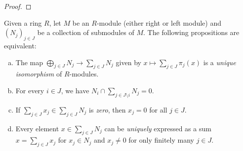 \begin{proof}


\end{proof}



\begin{proposition}
\label{prop:internal-sum-modules}
Given a ring \(R\), let \(M\) be an \(R\)-module (either right or left module)
and \((N_j)_{j \in J}\) be a collection of submodules of \(M\). The following
propositions are equivalent:
\begin{enumerate}[(a)]\setlength\itemsep{0em}
\item The map \(\bigoplus_{j \in J} N_j \to \sum_{j \in J} N_j\) given by
  \(x \mapsto \sum_{j \in J} \pi_j(x)\) is a \emph{unique isomorphism} of
  \(R\)-modules.

\item For every \(i \in J\), we have
  \(N_i \cap \sum_{j \in J \setminus i} N_j = 0\).

\item If \(\sum_{j \in J} x_j \in \sum_{j \in J} N_j\) is \emph{zero}, then
  \(x_j = 0\) for all \(j \in J\).

\item Every element \(x \in \sum_{j \in J} N_j\) can be \emph{uniquely}
  expressed as a sum \(x = \sum_{j \in J} x_j\) for \(x_j \in N_j\) and
  \(x_j \neq 0\) for only finitely many \(j \in J\).
\end{enumerate}
\end{proposition}

